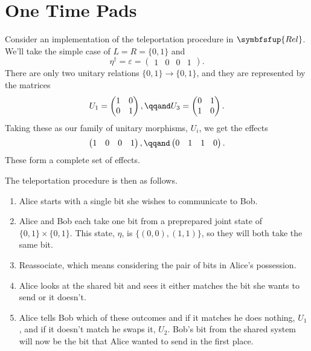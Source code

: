 \documentclass[fleqn]{NotesClass}
\makeatletter
\newcommand{\c@egory}[1]{\symbfsfup{#1}}
\newcommand{\Rel}{\c@egory{Rel}}
\makeatother
\begin{document}
    \section{One Time Pads}
    Consider an implementation of the teleportation procedure in \(\Rel\).
    We'll take the simple case of \(L = R = \{0, 1\}\) and
    \begin{equation}
        \eta^\dagger = \varepsilon = 
        \begin{pmatrix}
            1 & 0 & 0 & 1
        \end{pmatrix}
        .
    \end{equation}
    There are only two unitary relations \(\{0, 1\} \to \{0, 1\}\), and they are represented by the matrices
    \begin{equation}
        U_1 = 
        \begin{pmatrix}
            1 & 0\\
            0 & 1
        \end{pmatrix}
        , \qqand U_3 = 
        \begin{pmatrix}
            0 & 1\\
            1 & 0
        \end{pmatrix}
        .
    \end{equation}
    Taking these as our family of unitary morphisms, \(U_i\), we get the effects
    \begin{equation}
        \begin{pmatrix}
            1 & 0 & 0 & 1
        \end{pmatrix}
        , \qqand
        \begin{pmatrix}
            0 & 1 & 1 & 0
        \end{pmatrix}
        .
    \end{equation}
    These form a complete set of effects.
    
    The teleportation procedure is then as follows.
    \begin{enumerate}
        \item Alice starts with a single bit she wishes to communicate to Bob.
        \item Alice and Bob each take one bit from a preprepared joint state of \(\{0, 1\} \times \{0, 1\}\).
        This state, \(\eta\), is \(\{(0, 0), (1, 1)\}\), so they will both take the same bit.
        \item Reassociate, which means considering the pair of bits in Alice's possession.
        \item Alice looks at the shared bit and sees it either matches the bit she wants to send or it doesn't.
        \item Alice tells Bob which of these outcomes and if it matches he does nothing, \(U_1\), and if it doesn't match he swaps it, \(U_2\).
        Bob's bit from the shared system will now be the bit that Alice wanted to send in the first place.
    \end{enumerate}
    
\end{document}
